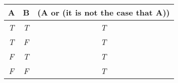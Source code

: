 

\begin{center}
\begin{tabular}{c c||c}
 A  & B & (A or  (it is not the case that A))\\
\hline
\emph{T} & \emph{T} & \emph{T} \\
\emph{T} & \emph{F} & \emph{T}  \\
\emph{F} & \emph{T} & \emph{T} \\
\emph{F} & \emph{F} & \emph{T} \\
\end{tabular}
\end{center}

